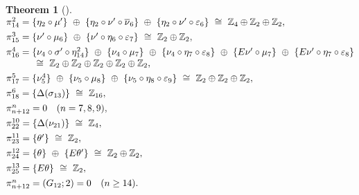 \documentclass[10pt, leqno]{ltjsarticle}
\makeatletter
\newenvironment{Thleft}[1][]{%
  \begin{theorem}[#1]\mbox{}\\[0ex]\begingroup
  \setlength{\arraycolsep}{0pt}%
  \renewcommand{\arraystretch}{1.0}%
  \noindent$\begin{array}{@{}l@{}}%
}{%
  \end{array}$\par\endgroup\end{theorem}%
}
\newcommand{\gen}[1]{\{#1\}}       %
\newcommand{\pit}[2]{\pi_{#1}^{#2}}
\numberwithin{equation}{section}
\theoremstyle{plain}
\newtheorem{theorem}{Theorem}[section]
\theoremstyle{definition}
\theoremstyle{remark}
\makeatother
\begin{document}
\begin{paracol}{2}

\begin{Thleft}[]
\pit{14}{2}
 = \gen{\eta_{2}\circ\mu'}\ \oplus\ 
   \gen{\eta_{2}\circ\nu'\circ \overline{\nu}_{6}}\ \oplus\
   \gen{\eta_{2}\circ\nu'\circ\varepsilon_{6}}
 \ \cong\ \mathbb Z_{4}\oplus\mathbb Z_{2}\oplus\mathbb Z_{2},\\[4pt]
\pit{15}{3}
 = \gen{\nu'\circ\mu_{6}}\ \oplus\ \gen{\nu'\circ\eta_{6}\circ\varepsilon_{7}}
 \ \cong\ \mathbb Z_{2}\oplus\mathbb Z_{2},\\[4pt]
\pit{16}{4}
 = \gen{\nu_{4}\circ\sigma'\circ\eta_{14}^{2}}
   \ \oplus\ \gen{\nu_{4}\circ\mu_{7}}
   \ \oplus\ \gen{\nu_{4}\circ\eta_{7}\circ\varepsilon_{8}}
   \ \oplus\ \gen{E\nu'\circ\mu_{7}}
   \ \oplus\ \gen{E\nu'\circ\eta_{7}\circ\varepsilon_{8}}
\\ \hspace{3.2em}
 \cong\ \mathbb Z_{2}\oplus\mathbb Z_{2}\oplus\mathbb Z_{2}\oplus\mathbb Z_{2}\oplus\mathbb Z_{2},\\[4pt]
\pit{17}{5}
 = \gen{\nu_{5}^{4}}\ \oplus\ \gen{\nu_{5}\circ\mu_{8}}\ \oplus\ \gen{\nu_{5}\circ\eta_{8}\circ\varepsilon_{9}}
 \ \cong\ \mathbb Z_{2}\oplus\mathbb Z_{2}\oplus\mathbb Z_{2},\\[4pt]
\pit{18}{6}=\gen{\Delta(\sigma_{13})}\ \cong\ \mathbb Z_{16},\\[4pt]
\pit{n+12}{n}=0\quad (n=7,8,9),\\[4pt]
\pit{22}{10}=\gen{\Delta(\nu_{21})}\ \cong\ \mathbb Z_{4},\\[4pt]
\pit{23}{11}=\gen{\theta'}\ \cong\ \mathbb Z_{2},\\[4pt]
\pit{24}{12}=\gen{\theta}\ \oplus\ \gen{E\theta'}\ \cong\ \mathbb Z_{2}\oplus\mathbb Z_{2},\\[4pt]
\pit{25}{13}=\gen{E\theta}\ \cong\ \mathbb Z_{2},\\[4pt]
\pit{n+12}{n}=(G_{12};2)=0\quad (n\ge14).
\end{Thleft}



\end{paracol}
\end{document}
